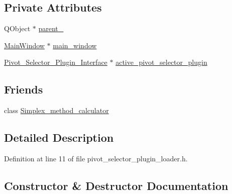 \subsection*{Private Attributes}
\begin{DoxyCompactItemize}
\item 
Q\+Object $\ast$ \hyperlink{classPivot__Selector__Plugin__Loader_a90e4dfd220d96b19e4c193ba8d3b23a8}{parent\+\_\+}
\item 
\hyperlink{classMainWindow}{Main\+Window} $\ast$ \hyperlink{classPivot__Selector__Plugin__Loader_aec51e144643c6811e2785097c47d8a7a}{main\+\_\+window}
\item 
\hyperlink{classPivot__Selector__Plugin__Interface}{Pivot\+\_\+\+Selector\+\_\+\+Plugin\+\_\+\+Interface} $\ast$ \hyperlink{classPivot__Selector__Plugin__Loader_afa6ba63fab9397d588851852e236ebf7}{active\+\_\+pivot\+\_\+selector\+\_\+plugin}
\end{DoxyCompactItemize}
\subsection*{Friends}
\begin{DoxyCompactItemize}
\item 
class \hyperlink{classPivot__Selector__Plugin__Loader_aa57bcac61e09f9c999a2f048dc923409}{Simplex\+\_\+method\+\_\+calculator}
\end{DoxyCompactItemize}


\subsection{Detailed Description}


Definition at line 11 of file pivot\+\_\+selector\+\_\+plugin\+\_\+loader.\+h.



\subsection{Constructor \& Destructor Documentation}
\mbox{\label{classPivot__Selector__Plugin__Loader_a3c3767b485a10ef690e224e2d521e375}} 
